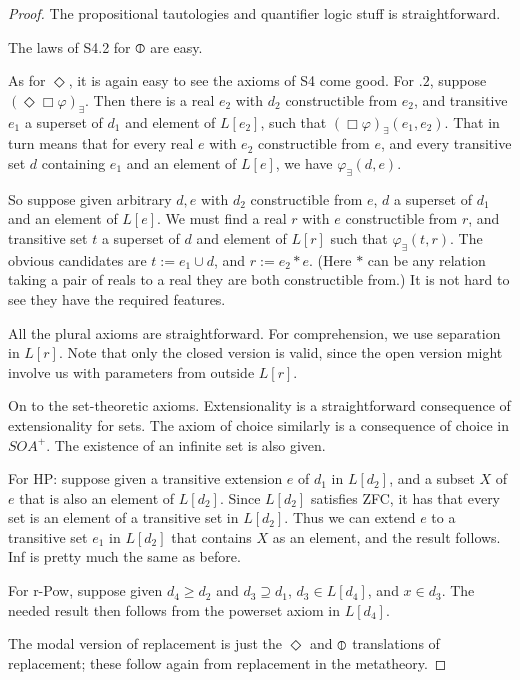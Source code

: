 \documentclass{article}
\begin{document}
    \begin{proof}
        The propositional tautologies and quantifier logic stuff is straightforward.
    
        The laws of S4.2 for $\circledbar$ are easy.

        As for $\Diamond$, it is again easy to see the axioms of S4 come good.
        For $.2$, suppose 
        $(\Diamond \Box \varphi)_\exists$. Then there is a real $e_2$ with $d_2$ constructible from
        $e_2$, and transitive $e_1$ a superset of $d_1$ and element of $L[e_2]$,
        such that $ (\Box \varphi)_\exists(e_1, e_2)$.
        That in turn means that for every real $e$ with $e_2$ constructible from $e$, and 
        every transitive 
        set $d$ containing $e_1$ and an element of $L[e]$, we have 
        $\varphi_\exists(d, e)$.

        So suppose given arbitrary $d, e$ with $d_2$ constructible from $e$, 
        $d$ a superset of $d_1$ and an element of $L[e]$. We must find a real $r$ 
        with $e$ constructible from $r$, and transitive set $t$ a superset of $d$ and element 
        of $L[r]$ such that $\varphi_\exists(t, r)$. The obvious candidates are 
        $t:= e_1 \cup d$, and $r := e_2*e$. (Here $*$ can be any relation taking a pair of 
        reals to a real they are both constructible from.) It is not hard to see they 
        have the required features.

        All the plural axioms are straightforward. For comprehension, we use 
        separation in $L[r]$. Note that only the closed version is valid, 
        since the open version might involve us with parameters from outside 
        $L[r]$.
    
        On to the set-theoretic axioms. 
        Extensionality is a straightforward consequence of extensionality for 
        sets. The axiom of choice similarly is a consequence of choice in $SOA^+$.
        The existence of an infinite set is also given.
        
        For HP: suppose given a transitive extension $e$ of $d_1$ in $L[d_2]$,
        and a subset $X$ of $e$ that is also an element of $L[d_2]$. Since $L[d_2]$
        satisfies ZFC, it has that 
        every set is an element of a transitive set in $L[d_2]$.
        Thus we can extend $e$ to a transitive 
        set $e_1$ in $L[d_2]$ that contains $X$ as an element, and the result follows. 
        Inf is pretty much the same as before.
        
        For r-Pow, suppose given $d_4 \geq d_2$ and $d_3 \supseteq d_1$, $d_3 \in L[d_4]$,
        and $x \in d_3$. The needed result then follows from the powerset axiom in 
        $L[d_4]$.

        The modal version of replacement is just the $\Diamond$ and $\circledbar$ 
        translations of replacement; these follow again from replacement in the metatheory.
    \end{proof}
\end{document}
